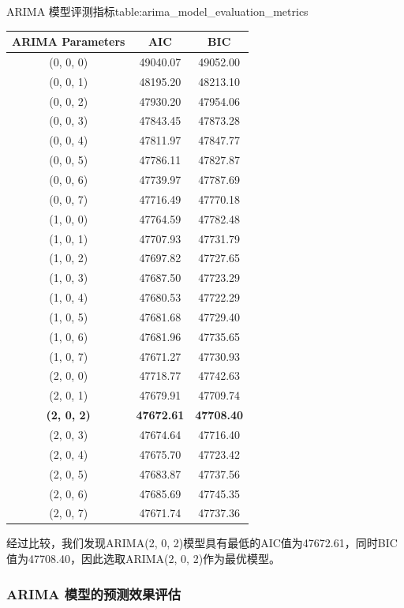 \documentclass[a4paper,AutoFakeBold,oneside,12pt]{book}
\begin{document}
\begin{bupttable}{ARIMA 模型评测指标}{table:arima_model_evaluation_metrics}
	\begin{tabular}{c|c|c}
	\hline
	\textbf{ARIMA Parameters} & \textbf{AIC} & \textbf{BIC} \\
	\hline
	(0, 0, 0) & 49040.07 & 49052.00 \\
	(0, 0, 1) & 48195.20 & 48213.10 \\
	(0, 0, 2) & 47930.20 & 47954.06 \\
	(0, 0, 3) & 47843.45 & 47873.28 \\
	(0, 0, 4) & 47811.97 & 47847.77 \\
	(0, 0, 5) & 47786.11 & 47827.87 \\
	(0, 0, 6) & 47739.97 & 47787.69 \\
	(0, 0, 7) & 47716.49 & 47770.18 \\
	(1, 0, 0) & 47764.59 & 47782.48 \\
	(1, 0, 1) & 47707.93 & 47731.79 \\
	(1, 0, 2) & 47697.82 & 47727.65 \\
	(1, 0, 3) & 47687.50 & 47723.29 \\
	(1, 0, 4) & 47680.53 & 47722.29 \\
	(1, 0, 5) & 47681.68 & 47729.40 \\
	(1, 0, 6) & 47681.96 & 47735.65 \\
	(1, 0, 7) & 47671.27 & 47730.93 \\
	(2, 0, 0) & 47718.77 & 47742.63 \\
	(2, 0, 1) & 47679.91 & 47709.74 \\
	\textbf{(2, 0, 2)} & \textbf{47672.61} & \textbf{47708.40} \\
	(2, 0, 3) & 47674.64 & 47716.40 \\
	(2, 0, 4) & 47675.70 & 47723.42 \\
	(2, 0, 5) & 47683.87 & 47737.56 \\
	(2, 0, 6) & 47685.69 & 47745.35 \\
	(2, 0, 7) & 47671.74 & 47737.36 \\
	\hline
	\end{tabular}
\end{bupttable}

经过比较，我们发现ARIMA(2, 0, 2)模型具有最低的AIC值为47672.61，同时BIC值为47708.40，因此选取ARIMA(2, 0, 2)作为最优模型。



\subsubsection{ARIMA 模型的预测效果评估}
\end{document}
